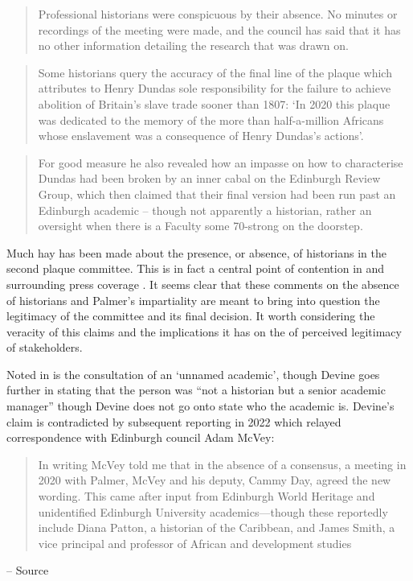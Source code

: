 \begin{quotation}
Professional historians were conspicuous by their absence. No minutes or recordings of the meeting were made, and the council has said that it has no other information detailing the research that was drawn on.
\end{quotation}
\cite{scotsman_2022}

\begin{quotation}
Some historians query the accuracy of the final line of the plaque which attributes to Henry Dundas sole responsibility for the failure to achieve abolition of Britain’s slave trade sooner than 1807: ‘In 2020 this plaque was dedicated to the memory of the more than half-a-million Africans whose enslavement was a consequence of Henry Dundas’s actions’.
\end{quotation}
\cite{mccarthy_2022_2}

\begin{quotation}
 For good measure he also revealed how an impasse on how to characterise Dundas had been broken by an inner cabal on the Edinburgh Review Group, which then claimed that their final version had been run past an Edinburgh academic – though not apparently a historian, rather an oversight when there is a Faculty some 70-strong on the doorstep. 
\end{quotation}
\cite{rowlands_2021}

Much hay has been made about the presence, or absence, of historians in the second plaque committee. This is in fact a central point of contention in \cite{devine_2020,rowlands_2021,fry_2020} and surrounding press coverage \cite{scotsman_2022}. It seems clear that these comments on the absence of historians and Palmer's impartiality are meant to bring into question the legitimacy of the committee and its final decision. It worth considering the veracity of this claims and the implications it has on the of perceived legitimacy of stakeholders. 

Noted in \cite{devine_2020,scotsman_2022,rowlands_2021,fry_2020} is the consultation of an `unnamed academic', though Devine goes further in stating that the person was ``not a historian but a senior academic manager'' \cite{devine_2020} though Devine does not go onto state who the academic is. Devine's claim is contradicted by subsequent reporting in 2022 which relayed correspondence with Edinburgh council Adam McVey:

\begin{quotation}
    In writing McVey told me that in the absence of a consensus, a meeting in 2020 with Palmer, McVey and his deputy, Cammy Day, agreed the new wording. This came after input from Edinburgh World Heritage and unidentified Edinburgh University academics—though these reportedly include Diana Patton, a historian of the Caribbean, and James Smith, a vice principal and professor of African and development studies
\end{quotation}
\begin{flushright}
-- Source \cite{lloyd_2022}
\end{flushright}


